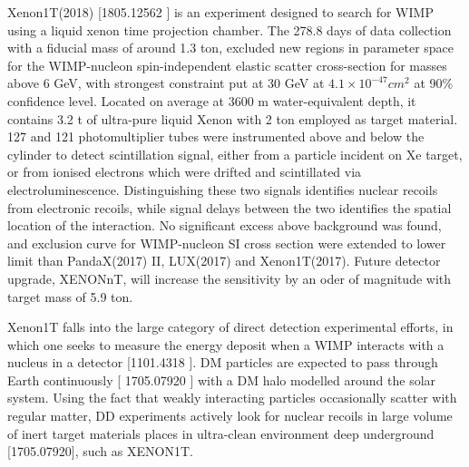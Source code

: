 \documentclass[12pt]{article}
\begin{document}
 


Xenon1T(2018) [1805.12562 ]  is an experiment designed to search for WIMP using a liquid xenon time projection chamber. The 278.8 days of data collection with a fiducial mass of around 1.3 ton, excluded new regions in parameter space for the WIMP-nucleon spin-independent elastic scatter cross-section for masses above 6 GeV, with strongest constraint put at 30 GeV at $4.1 \times 10^{-47} cm^2$ at 90\% confidence level. Located on average at 3600 m water-equivalent depth, it contains 3.2 t of ultra-pure liquid Xenon with 2 ton employed as target material. 127 and 121 photomultiplier tubes were instrumented above and below the cylinder to detect scintillation signal, either from a particle incident on Xe target, or from ionised electrons which were drifted and scintillated via electroluminescence. Distinguishing these two signals identifies nuclear recoils from electronic recoils, while signal delays between the two identifies the spatial location of the interaction. No significant excess above background was found, and exclusion curve for WIMP-nucleon SI cross section were extended to lower limit than PandaX(2017) II, LUX(2017) and Xenon1T(2017). Future detector upgrade, XENONnT, will increase the sensitivity by an oder of magnitude with target mass of 5.9 ton. 

Xenon1T falls into the large category of direct detection experimental efforts, in which one seeks to measure the energy deposit when a WIMP interacts with a nucleus in a detector [1101.4318 ]. DM particles are expected to pass through Earth continuously [ 1705.07920 ] with a DM halo modelled around the solar system. Using the fact that weakly interacting particles occasionally scatter with regular matter, DD experiments actively look for nuclear recoils in large volume of inert target materials places in ultra-clean environment deep underground [1705.07920], such as XENON1T. 
\end{document}
